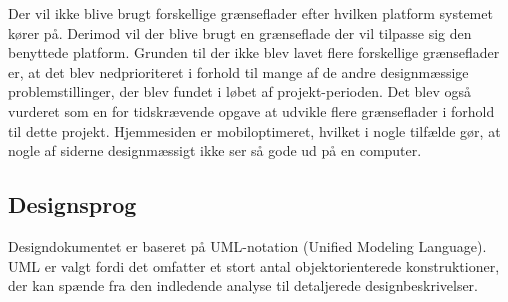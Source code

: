 Der vil ikke blive brugt forskellige grænseflader efter hvilken platform systemet kører på. Derimod vil der blive brugt en grænseflade der vil tilpasse sig den benyttede platform. Grunden til der ikke blev lavet flere forskellige grænseflader er, at det blev nedprioriteret i forhold til mange af de andre designmæssige problemstillinger, der blev fundet i løbet af projekt-perioden. Det blev også vurderet som en for tidskrævende opgave at udvikle flere grænseflader i forhold til dette projekt. Hjemmesiden er mobiloptimeret, hvilket i nogle tilfælde gør, at nogle af siderne designmæssigt ikke ser så gode ud på en computer.

\subsection{Designsprog}
Designdokumentet er baseret på UML-notation (Unified Modeling Language). UML er valgt fordi det omfatter et stort antal objektorienterede konstruktioner, der kan spænde fra den indledende analyse til detaljerede designbeskrivelser. 